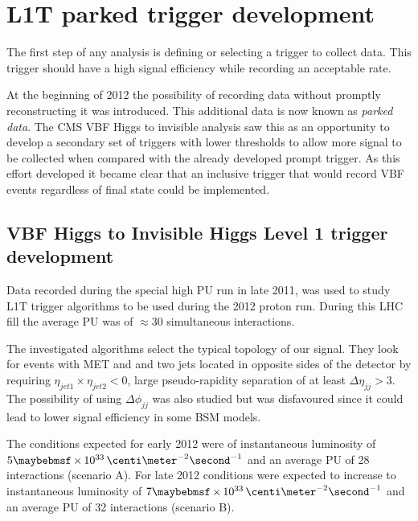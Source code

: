 \section{L1T parked trigger development}
\label{SECTION:PreparationParkedDataAnalysis_ParkedTriggerDevelopment}


The first step of any analysis is defining or selecting a trigger to collect data. This trigger should have a high signal efficiency while recording an acceptable rate.

At the beginning of 2012 the possibility of recording data without promptly reconstructing it was introduced. This additional data is now known as \textit{parked data}. The \gls{CMS} \gls{VBF} Higgs to invisible analysis saw this as an opportunity to develop a secondary set of triggers with lower thresholds to allow more signal to be collected when compared with the already developed prompt trigger. As this effort developed it became clear that an inclusive trigger that would record \gls{VBF} events regardless of final state could be implemented.

\subsection{VBF Higgs to Invisible Higgs Level 1 trigger development}
\label{SUBSECTION:ParkedDataAnalysis_ParkedTriggerDevelopment_VBFHiggsInvisibleTrigger}


Data recorded during the special high \gls{PU} run in late 2011, was used to study \gls{L1T} trigger algorithms to be used during the 2012 proton run. During this \gls{LHC} fill the average \gls{PU} was of $\approx 30$ simultaneous interactions. 

The investigated algorithms select the typical topology of our signal. They look for events with \gls{MET} and and two jets located in opposite sides of the detector by requiring $\eta_{jet1}\times\eta_{jet2}<0$, large pseudo-rapidity separation of at least $\Delta\eta_{jj}>3$. The possibility of using $\Delta\phi_{jj}$ was also studied but was disfavoured since it could lead to lower signal efficiency in some \gls{BSM} models.

The conditions expected for early 2012 were of instantaneous luminosity of $5 \times 10^{33}\,\centi\meter^{-2}\second^{-1}$ and an average \gls{PU} of 28 interactions (scenario A). For late 2012 conditions were expected to increase to instantaneous luminosity of $7 \times 10^{33}\,\centi\meter^{-2}\second^{-1}$ and an average \gls{PU} of 32 interactions (scenario B).

